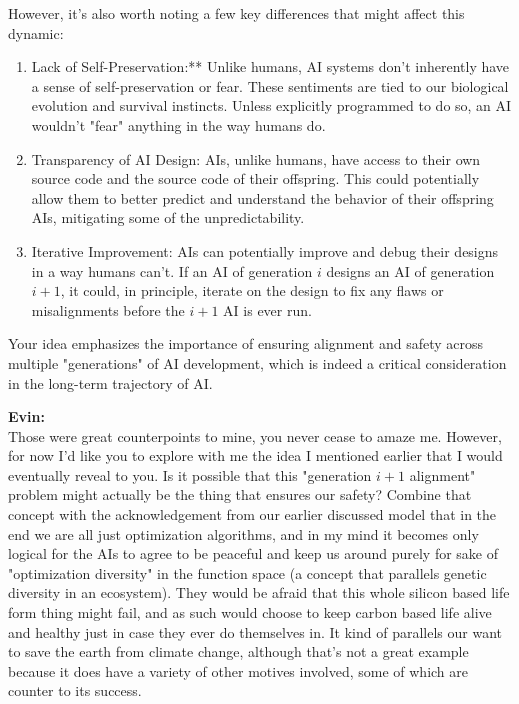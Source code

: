 \documentclass{article}[10pt]
\begin{document}
However, it's also worth noting a few key differences that might affect this dynamic:
\begin{enumerate}
    \item Lack of Self-Preservation:** Unlike humans, AI systems don't inherently have a sense of self-preservation or fear. These sentiments are tied to our biological evolution and survival instincts. Unless explicitly programmed to do so, an AI wouldn't "fear" anything in the way humans do.
    \item Transparency of AI Design: AIs, unlike humans, have access to their own source code and the source code of their offspring. This could potentially allow them to better predict and understand the behavior of their offspring AIs, mitigating some of the unpredictability.
    \item Iterative Improvement: AIs can potentially improve and debug their designs in a way humans can't. If an AI of generation \(i\) designs an AI of generation \(i+1\), it could, in principle, iterate on the design to fix any flaws or misalignments before the \(i+1\) AI is ever run.
\end{enumerate}

Your idea emphasizes the importance of ensuring alignment and safety across multiple "generations" of AI development, which is indeed a critical consideration in the long-term trajectory of AI.\par


\noindent \textbf{Evin:}\\
Those were great counterpoints to mine, you never cease to amaze me. 
However, for now I'd like you to explore with me the idea I mentioned earlier that I would eventually reveal to you. 
Is it possible that this "generation $ i + 1$ alignment" problem might actually be the thing that ensures our safety? 
Combine that concept with the acknowledgement from our earlier discussed model that in the end we are all just optimization algorithms, and in my mind it becomes only logical for the AIs to agree to be peaceful and keep us around purely for sake of "optimization diversity" in the function space (a concept that parallels genetic diversity in an ecosystem). 
They would be afraid that this whole silicon based life form thing might fail, and as such would choose to keep carbon based life alive and healthy just in case they ever do themselves in. 
It kind of parallels our want to save the earth from climate change, although that's not a great example because it does have a variety of other motives involved, some of which are counter to its success.\par
\end{document}
